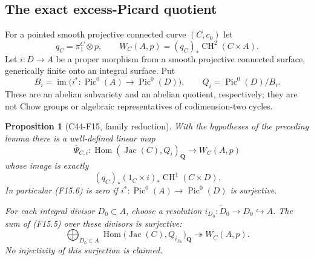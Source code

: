 \documentclass[11pt]{article}
\newtheorem{proposition}[theorem]{Proposition}
\theoremstyle{remark}\newtheorem{remark}[theorem]{Remark}
\begin{document}
\subsection{The exact excess-Picard quotient}

For a pointed smooth projective connected curve $(C,c_0)$ let
\[
 q_C=\pi_1^C\otimes p,
 \qquad W_C(A,p)=(q_C)_*\operatorname{CH}^2(C\times A).
 \tag{F15.3}
\]
Let $i:D\longrightarrow A$ be a proper morphism from a smooth
projective connected surface, generically finite onto an integral
surface.  Put
\[
 B_i=\operatorname{im}\bigl(i^*:\operatorname{Pic}^0(A)
                  \longrightarrow\operatorname{Pic}^0(D)\bigr),
 \qquad Q_i=\operatorname{Pic}^0(D)/B_i.
 \tag{F15.4}
\]
These are an abelian subvariety and an abelian quotient, respectively;
they are not Chow groups or algebraic representatives of codimension-two
cycles.

\begin{proposition}[C44-F15, family reduction]\label{C44-F15}
With the hypotheses of the preceding lemma there is a well-defined
linear map
\[
 \overline\Psi_{C,i}:
 \operatorname{Hom}(\operatorname{Jac}(C),Q_i)_{\mathbf Q}
                  \longrightarrow W_C(A,p)
 \tag{F15.5}
\]
whose image is exactly
\[
 (q_C)_*(1_C\times i)_*
                    \operatorname{CH}^1(C\times D).
 \tag{F15.6}
\]
In particular (F15.6) is zero if $i^*:\operatorname{Pic}^0(A)
\longrightarrow\operatorname{Pic}^0(D)$ is surjective.

For each integral divisor $D_0\subset A$, choose a resolution
$i_{D_0}:\widetilde D_0\longrightarrow D_0\hookrightarrow A$.
The sum of (F15.5) over these divisors is surjective:
\[
 \bigoplus_{D_0\subset A}
 \operatorname{Hom}\bigl(\operatorname{Jac}(C),Q_{i_{D_0}}\bigr)_{\mathbf Q}
       \twoheadrightarrow W_C(A,p).
 \tag{F15.7}
\]
No injectivity of this surjection is claimed.
\end{proposition}
\end{document}
